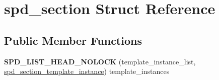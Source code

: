 \hypertarget{structspd__section}{
\section{spd\_\-section Struct Reference}
\label{structspd__section}
}
\subsection*{Public Member Functions}
\begin{DoxyCompactItemize}
\item 
\hypertarget{structspd__section_aacbf0aebc26d52fda384bf45b64fa251}{
{\bfseries SPD\_\-LIST\_\-HEAD\_\-NOLOCK} (template\_\-instance\_\-list, \hyperlink{structspd__section__template__instance}{spd\_\-section\_\-template\_\-instance}) template\_\-instances}
\label{structspd__section_aacbf0aebc26d52fda384bf45b64fa251}

\end{DoxyCompactItemize}
